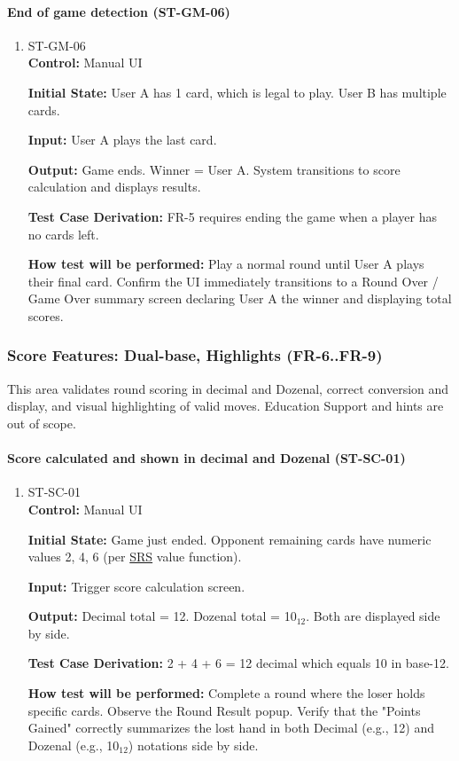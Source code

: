 \documentclass[12pt, titlepage]{article}
\begin{document}
\paragraph{End of game detection (ST-GM-06)}
\begin{enumerate}
\item{ST-GM-06\\}
\textbf{Control:} Manual UI

\textbf{Initial State:} User A has 1 card, which is legal to play. User B has multiple cards.

\textbf{Input:} User A plays the last card.

\textbf{Output:} Game ends. Winner = User A. System transitions to score calculation and displays results.

\textbf{Test Case Derivation:} FR-5 requires ending the game when a player has no cards left.

\textbf{How test will be performed:} Play a normal round until User A plays their final card. Confirm the UI immediately transitions to a Round Over / Game Over summary screen declaring User A the winner and displaying total scores.
\end{enumerate}

\subsubsection{Score Features: Dual-base, Highlights (FR-6..FR-9)}

This area validates round scoring in decimal and Dozenal, correct conversion and display, and visual highlighting of valid moves. Education Support and hints are out of scope.

\paragraph{Score calculated and shown in decimal and Dozenal (ST-SC-01)}
\begin{enumerate}
\item{ST-SC-01\\}
\textbf{Control:} Manual UI

\textbf{Initial State:} Game just ended. Opponent remaining cards have numeric values 2, 4, 6 (per \href{../SRS/SRS.pdf}{SRS} value function).

\textbf{Input:} Trigger score calculation screen.

\textbf{Output:} Decimal total = 12. Dozenal total = 10$_{12}$. Both are displayed side by side.

\textbf{Test Case Derivation:} 2 + 4 + 6 = 12 decimal which equals 10 in base-12.

\textbf{How test will be performed:} Complete a round where the loser holds specific cards. Observe the Round Result popup. Verify that the "Points Gained" correctly summarizes the lost hand in both Decimal (e.g., 12) and Dozenal (e.g., 10$_{12}$) notations side by side.
\end{enumerate}
\end{document}
